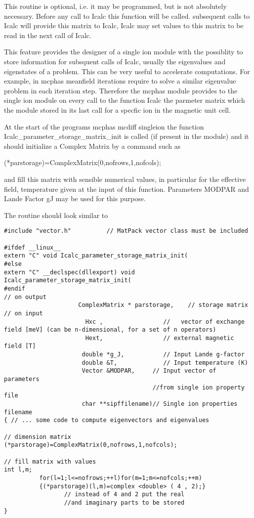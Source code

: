 This routine is optional, i.e. it may be programmed, but is not absolutely necessary.
Before any call to Icalc this function will be called. subsequent calls to Icalc will provide this matrix to %
Icalc, Icalc may set values to this matrix to be read in the next call
of Icalc.

This feature provides the designer of a single ion module  with the possiblity to store information for subsquent %
calls of Icalc,
 usually the eigenvalues and eigenstates of a problem. This can be very useful to accelerate computations. For %
example, in {\prg mcphas} meanfield iterations require
to solve a similar eigenvalue problem in each iteration step. Therefore the {\prg mcphas} module provides
to the single ion module on every call to the function {\prg Icalc} the parmeter matrix {\prg }
which the module stored in its last call for a specfic ion in the magnetic unit cell.

At the start of the programs {\prg mcphas} {\prg mcdiff} {\prg singleion} the function {\prg %
Icalc\_parameter\_storage\_matrix\_init}
is called (if present in the module) and it should initialize a Complex Matrix by a command such as

{\prg (*parstorage)=ComplexMatrix(0,nofrows,1,nofcols);}

and fill this matrix with sensible numerical values, in particular for the effective field, temperature given at %
the input of this function.
Parameters {\prg MODPAR} and Lande Factor {\prg gJ} may be used for this purpose.

The routine should look similar to
{\footnotesize
\begin{verbatim}
#include "vector.h"          // MatPack vector class must be included

#ifdef __linux__
extern "C" void Icalc_parameter_storage_matrix_init(
#else
extern "C" __declspec(dllexport) void Icalc_parameter_storage_matrix_init(
#endif
// on output
                     ComplexMatrix * parstorage,    // storage matrix
// on input
                       Hxc ,                 //   vector of exchange field [meV] (can be n-dimensional, for a set of n operators)
                       Hext,                 // external magnetic field [T]
                      double *g_J,           // Input Lande g-factor
                      double &T,             // Input temperature (K)
                      Vector &MODPAR,     // Input vector of parameters 
                                          //from single ion property file
                      char **sipffilename)// Single ion properties filename
{ // ... some code to compute eigenvectors and eigenvalues

// dimension matrix
(*parstorage)=ComplexMatrix(0,nofrows,1,nofcols);

// fill matrix with values
int l,m;
          for(l=1;l<=nofrows;++l)for(m=1;m<=nofcols;++m)
          {(*parstorage)(l,m)=complex <double> ( 4 , 2);}
                 // instead of 4 and 2 put the real 
                 //and imaginary parts to be stored
}
\end{verbatim}
}


